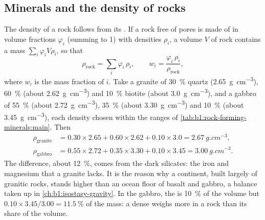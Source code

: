 \subsection{Minerals and the density of rocks}

The density of a rock follows from its . If a rock free of pores is
made of  in volume fractions $\varphi_i$ (summing to 1) with
densities $\rho_i$, a volume $V$ of rock contains a mass
$\sum_i \varphi_i V \rho_i$, so that
\[
  \rho_{\text{rock}} = \sum_i \varphi_i\,\rho_i ,
  \qquad
  w_i = \frac{\varphi_i\,\rho_i}{\rho_{\text{rock}}},
\]
where $w_i$ is the mass fraction of  $i$. Take a granite of
\qty{30}{\percent} quartz (\qty{2.65}{g.cm^{-3}}), \qty{60}{\percent}
 (about \qty{2.62}{g.cm^{-3}}) and \qty{10}{\percent} biotite (about
\qty{3.0}{g.cm^{-3}}), and a gabbro of \qty{55}{\percent}  (about
\qty{2.72}{g.cm^{-3}}), \qty{35}{\percent}  (about
\qty{3.30}{g.cm^{-3}}) and \qty{10}{\percent}  (about
\qty{3.45}{g.cm^{-3}}), each density chosen within the ranges of
\cref{tab:b1:rock-forming-minerals:main}. Then
\begin{align*}
  \rho_{\text{granite}} &= 0.30\times2.65 + 0.60\times2.62 + 0.10\times3.0
  = \qty{2.67}{g.cm^{-3}},\\
  \rho_{\text{gabbro}} &= 0.55\times2.72 + 0.35\times3.30 + 0.10\times3.45
  = \qty{3.00}{g.cm^{-3}}.
\end{align*}
The difference, about \qty{12}{\percent}, comes from the dark silicates: the
iron and magnesium that a granite lacks. It is the reason why a continent,
built largely of granitic rocks, stands higher than an ocean floor of basalt
and gabbro, a balance taken up in \cref{ch:b1:isostasy-gravity}. In the
gabbro, the  is \qty{10}{\percent} of the volume but
$0.10\times3.45/3.00 = \qty{11.5}{\percent}$ of the mass: a dense 
weighs more in a rock than its share of the volume.

